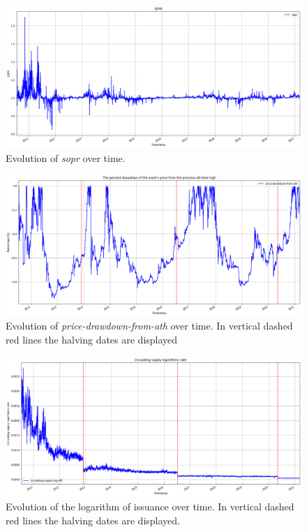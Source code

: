 \begin{figure}[H]
    \centering
    \includegraphics[width=\textwidth]{methods/images/sopr.png}
    \caption{Evolution of \emph{sopr} over time.}
    \label{fig:sopr}
\end{figure}

\begin{figure}[H]
    \centering
    \includegraphics[width=\textwidth]{methods/images/price-drawdown-from-ath.png}
    \caption{Evolution of \emph{price-drawdown-from-ath} over time. In vertical
    dashed red lines the halving dates are displayed}
    \label{fig:price-drawdown-from-ath}
\end{figure}

\begin{figure}[H]
    \centering
    \includegraphics[width=\textwidth]{methods/images/circulating_supply_rate.png}
    \caption{Evolution of the logarithm of issuance over time. In vertical
    dashed red lines the halving dates are displayed.}
    \label{fig:circulating_supply_rate}
\end{figure}


